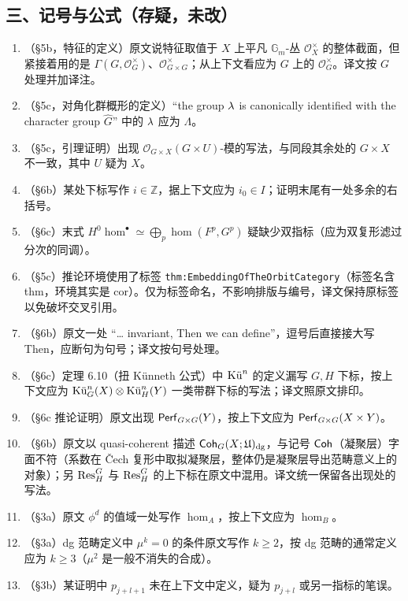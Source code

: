 \subsection*{三、记号与公式（存疑，未改）}
\begin{enumerate}[leftmargin=1.6em,itemsep=2pt,resume]
\item （§5b，特征的定义）原文说特征取值于 $X$ 上平凡 $\mathbb{G}_m$-丛 $\mathcal{O}_X^{\times}$ 的整体截面，但紧接着用的是 $\Gamma(G,\mathcal{O}_G^{\times})$、$\mathcal{O}_{G\times G}^{\times}$；从上下文看应为 $G$ 上的 $\mathcal{O}_G^{\times}$。译文按 $G$ 处理并加译注。
\item （§5c，对角化群概形的定义）``the group $\cha$ is canonically identified with the character group $\widehat{G}$'' 中的 $\cha$ 应为 $\Lambda$。
\item （§5c，引理证明）出现 $\mathcal{O}_{G\times X}(G\times U)$-模的写法，与同段其余处的 $G\times X$ 不一致，其中 $U$ 疑为 $X$。
\item （§6b）某处下标写作 $i\in\mathbb{Z}$，据上下文应为 $i_0\in I$；证明末尾有一处多余的右括号。
\item （§6c）末式 $H^0\hom^{\bullet}\simeq\bigoplus_p\hom(F^p,G^p)$ 疑缺少双指标（应为双复形滤过分次的同调）。
\item （§5c）推论环境使用了标签 \texttt{thm:EmbeddingOfTheOrbitCategory}（标签名含 thm，环境其实是 cor）。仅为标签命名，不影响排版与编号，译文保持原标签以免破坏交叉引用。
\item （§6b）原文一处 ``\ldots{} invariant, Then we can define''，逗号后直接接大写 Then，应断句为句号；译文按句号处理。
\item （§6c）定理 6.10（扭 Künneth 公式）中 $\Ku^n$ 的定义漏写 $G,H$ 下标，按上下文应为 $\Ku^n_G(X)\otimes\Ku^n_H(Y)$ 一类带群下标的写法；译文照原文排印。
\item （§6c 推论证明）原文出现 $\Perf_{G\times G}(Y)$，按上下文应为 $\Perf_{G\times G}(X\times Y)$。
\item （§6b）原文以 quasi-coherent 描述 $\Coh_G(X;\mathfrak{U})_{\dg}$，与记号 $\Coh$（凝聚层）字面不符（系数在 Čech 复形中取拟凝聚层，整体仍是凝聚层导出范畴意义上的对象）；另 $\Res^G_H$ 与 $\Res_H^G$ 的上下标在原文中混用。译文统一保留各出现处的写法。
\item （§3a）原文 $\phi^d$ 的值域一处写作 $\hom_A$，按上下文应为 $\hom_B$。
\item （§3a）dg 范畴定义中 $\mu^k=0$ 的条件原文写作 $k\ge 2$，按 dg 范畴的通常定义应为 $k\ge 3$（$\mu^2$ 是一般不消失的合成）。
\item （§3b）某证明中 $p_{j+l+1}$ 未在上下文中定义，疑为 $p_{j+l}$ 或另一指标的笔误。
\end{enumerate}

